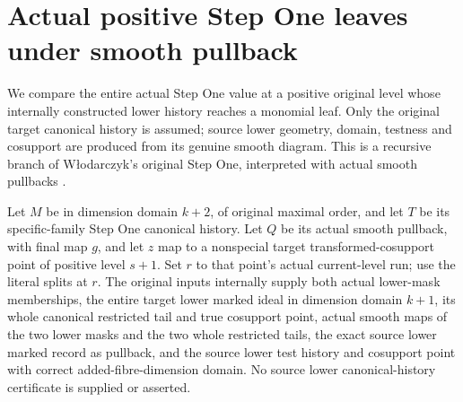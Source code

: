 \section{Actual positive Step One leaves under smooth pullback}

We compare the entire actual Step One value at a positive original level
whose internally constructed lower history reaches a monomial leaf.  Only
the original target canonical history is assumed; source lower geometry,
domain, testness and cosupport are produced from its genuine smooth diagram.
This is a recursive branch of W\l odarczyk's original Step One, interpreted
with actual smooth pullbacks \cite{wlodarczyk05-hironaka,bierstone-milman08-functoriality}.

\begin{theorem}
\label{hir:smooth-original-positive-canonical-lower-diagram}
\leanok
{}
Let $M$ be in dimension domain $k+2$, of original maximal order, and let
$T$ be its specific-family Step One canonical history.  Let $Q$ be its
actual smooth pullback, with final map $g$, and let $z$ map to a nonspecial
target transformed-cosupport point of positive level $s+1$.  Set $r$ to
that point's actual current-level run; use the literal splits at $r$.
The original inputs internally supply both actual lower-mask memberships,
the entire target lower marked ideal in dimension domain $k+1$, its whole
canonical restricted tail and true cosupport point, actual smooth maps
of the two lower masks and the two whole restricted tails, the exact
source lower marked record as pullback, and the source lower test history
and cosupport point with correct added-fibre-dimension domain.
No source lower canonical-history certificate is supplied or asserted.
\end{theorem}
